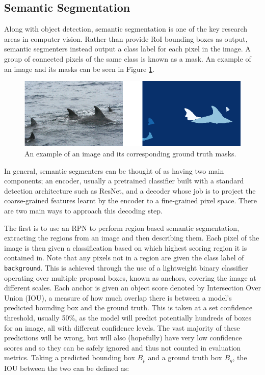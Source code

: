 \subsection{Semantic Segmentation}\label{ch:Background,sec:semanticSegmentation}

Along with object detection, semantic segmentation is one of the key research areas in computer vision. Rather than provide RoI bounding boxes as output, semantic segmenters instead output a class label for each pixel in the image. A group of connected pixels of the same class is known as a mask. An example of an image and its masks can be seen in Figure \ref{fig:masks-example}.

\begin{figure}
	\begin{center}
		\includegraphics[scale=0.5]{Chapter2/figs/masks-example.png}
	\end{center}
	\caption{An example of an image and its corresponding ground truth masks.}
	\label{fig:masks-example}
\end{figure}

In general, semantic segmenters can be thought of as having two main components; an encoder, usually a pretrained classifier built with a standard detection architecture such as ResNet, and a decoder whose job is to project the coarse-grained features learnt by the encoder to a fine-grained pixel space. There are two main ways to approach this decoding step.

The first is to use an RPN to perform region based semantic segmentation, extracting the regions from an image and then describing them. Each pixel of the image is then given a classification based on which highest scoring region it is contained in. Note that any pixels not in a region are given the class label of \texttt{background}. This is achieved through the use of a lightweight binary classifier operating over multiple proposal boxes, known as anchors, covering the image at different scales. Each anchor is given an object score denoted by Intersection Over Union (IOU), a measure of how much overlap there is between a model's predicted bounding box and the ground truth. This is taken at a set confidence threshold, usually 50\%, as the model will predict potentially hundreds of boxes for an image, all with different confidence levels. The vast majority of these predictions will be wrong, but will also (hopefully) have very low confidence scores and so they can be safely ignored and thus not counted in evaluation metrics. Taking a predicted bounding box $B_p$ and a ground truth box $B_g$, the IOU between the two can be defined as:


